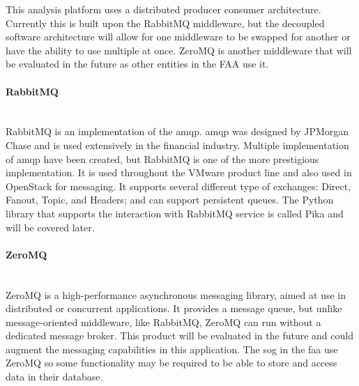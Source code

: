 This analysis platform uses a distributed producer consumer architecture.  Currently this is built upon the RabbitMQ middleware, but the decoupled software architecture will allow for one middleware to be swapped for another or have the ability to use multiple at once. ZeroMQ is another middleware that will be evaluated in the future as other entities in the FAA use it.
\paragraph{RabbitMQ} ~\\
RabbitMQ is an implementation of the \ac{amqp}. \ac{amqp} was designed by JPMorgan Chase and is used extensively in the financial industry.  Multiple implementation of \ac{amqp} have been created, but RabbitMQ is one of the more prestigious implementation. It is used throughout the VMware product line and also used in OpenStack for messaging. It supports several different type of exchanges: Direct, Fanout, Topic, and Headers; and can support persistent queues. The Python library that supports the interaction with RabbitMQ service is called Pika and will be covered later.

\paragraph{ZeroMQ} ~\\
ZeroMQ is a high-performance asynchronous messaging library, aimed at use in distributed or concurrent applications. It provides a message queue, but unlike message-oriented middleware, like RabbitMQ, ZeroMQ can run without a dedicated message broker. This product will be evaluated in the future and could augment the messaging capabilities in this application. The \ac{sog} in the \ac{faa} use ZeroMQ so some functionality may be required to be able to store and access data in their database.

